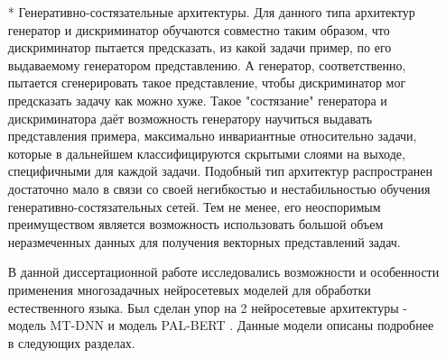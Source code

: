 \begin{itemize}
\item[*] Генеративно-состязательные архитектуры. Для данного типа архитектур генератор и дискриминатор обучаются совместно таким образом, что дискриминатор пытается предсказать, из какой задачи пример, по его выдаваемому генератором представлению. А генератор, соответственно, пытается сгенерировать такое представление, чтобы дискриминатор мог предсказать задачу как можно хуже. Такое "состязание" генератора и дискриминатора даёт возможность генератору научиться выдавать представления примера, максимально инвариантные относительно задачи, которые в дальнейшем классифицируются скрытыми слоями на выходе, специфичными для каждой задачи. Подобный тип архитектур распространен достаточно мало в связи со своей негибкостью и нестабильностью обучения генеративно-состязательных сетей. Тем не менее, его неоспоримым преимуществом является возможность использовать большой объем неразмеченных данных для получения векторных представлений задач. 

В данной диссертационной работе исследовались возможности и особенности применения многозадачных нейросетевых моделей для обработки естественного языка. Был сделан упор на 2 нейросетевые архитектуры - модель MT-DNN \cite{Liu_He_Chen_Gao_2019} и модель PAL-BERT \cite{Stickland_Murray_2019}. Данные модели описаны подробнее в следующих разделах.


\end{itemize}
